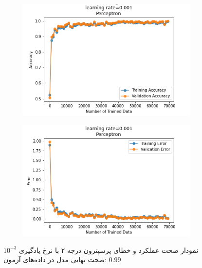 \documentclass[12pt, a4paper]{article}
\begin{document}
\begin{figure}[h]
    \begin{subfigure}{0.45\linewidth}
        \centering
        \includegraphics[width=\linewidth]{images/6/perceptron/lr/acc_0.001.png}
    \end{subfigure}
    \hfil
    \begin{subfigure}{0.45\linewidth}
        \centering
        \includegraphics[width=\linewidth]{images/6/perceptron/lr/error_0.001.png}
    \end{subfigure}
    \caption{نمودار صحت عملکرد‌ و خطای پرسپترون درجه ۲ با نرخ یادگیری $10^{-3}$
    \newline
    صحت نهایی مدل در داده‌های آزمون: $0.99$}
\end{figure}
\end{document}
